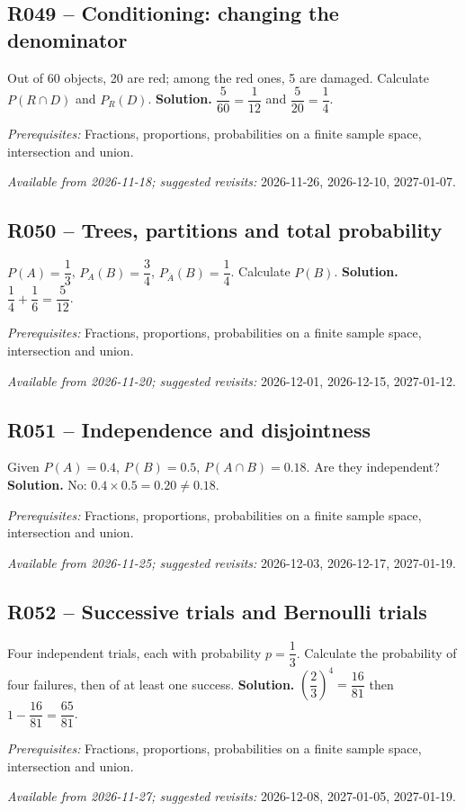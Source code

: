 \subsection*{R049 -- Conditioning: changing the denominator}\label{R049}
Out of 60 objects, 20 are red; among the red ones, 5 are damaged. Calculate $P(R\cap D)$ and $P_R(D)$.
\ifmxteacher\textbf{Solution.} $\dfrac{5}{60}=\dfrac{1}{12}$ and $\dfrac{5}{20}=\dfrac{1}{4}$.\par\textit{Prerequisites:} Fractions, proportions, probabilities on a finite sample space, intersection and union.\par\textit{Available from 2026-11-18; suggested revisits:} 2026-11-26, 2026-12-10, 2027-01-07.\fi
{}\subsection*{R050 -- Trees, partitions and total probability}\label{R050}
$P(A)=\dfrac{1}{3}$, $P_A(B)=\dfrac{3}{4}$, $P_{\overline A}(B)=\dfrac{1}{4}$. Calculate $P(B)$.
\ifmxteacher\textbf{Solution.} $\dfrac{1}{4}+\dfrac{1}{6}=\dfrac{5}{12}$.\par\textit{Prerequisites:} Fractions, proportions, probabilities on a finite sample space, intersection and union.\par\textit{Available from 2026-11-20; suggested revisits:} 2026-12-01, 2026-12-15, 2027-01-12.\fi
{}\subsection*{R051 -- Independence and disjointness}\label{R051}
Given $P(A)=\num{0,4}$, $P(B)=\num{0,5}$, $P(A\cap B)=\num{0,18}$. Are they independent?
\ifmxteacher\textbf{Solution.} No: $\num{0,4}\times\num{0,5}=\num{0,20}\ne\num{0,18}$.\par\textit{Prerequisites:} Fractions, proportions, probabilities on a finite sample space, intersection and union.\par\textit{Available from 2026-11-25; suggested revisits:} 2026-12-03, 2026-12-17, 2027-01-19.\fi
{}\subsection*{R052 -- Successive trials and Bernoulli trials}\label{R052}
Four independent trials, each with probability $p=\dfrac{1}{3}$. Calculate the probability of four failures, then of at least one success.
\ifmxteacher\textbf{Solution.} $(\dfrac{2}{3})^4=\dfrac{16}{81}$ then $1-\dfrac{16}{81}=\dfrac{65}{81}$.\par\textit{Prerequisites:} Fractions, proportions, probabilities on a finite sample space, intersection and union.\par\textit{Available from 2026-11-27; suggested revisits:} 2026-12-08, 2027-01-05, 2027-01-19.\fi
